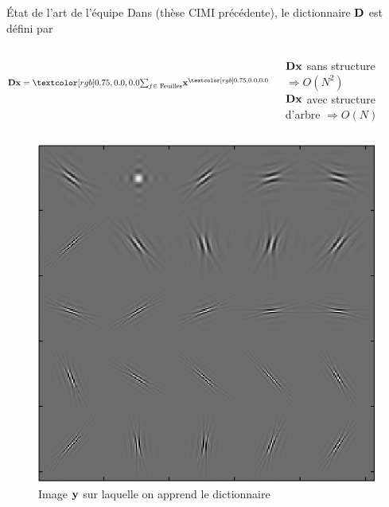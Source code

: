 \begin{frame}{État de l'art de l'équipe}
Dans  (\alert{thèse CIMI} précédente), le dictionnaire $\mathbf D$ est défini par
\begin{columns}
\begin{column}{0.60\textwidth}
\\
$\D \code = \Req{\sum_{f \in \text{ Feuilles}}} \code^{\Req{f}} * \underbrace{h^{\Req{f}}* \dots* h^{r}}_{\textrm{de la racine à la feuille}}$
\end{column}
\begin{column}{0.50\textwidth} { \small
\Req{\xmark} $\mathbf D \mathbf x$ sans structure $\Rightarrow O(N^2)$\\
\Geq{\cmark} $\mathbf D \mathbf x$ avec structure d'arbre $\Rightarrow O(N)$
}
\end{column}
\end{columns}

	\begin{columns}
	\begin{column}{0.30\textwidth}
    	\begin{figure}\centering
	\includegraphics[width=1\linewidth]{figures/curv_datafit2.png}
	\caption{Image $\mathbf y$ sur laquelle on apprend le dictionnaire}
	\end{figure}


\end{column}
\end{columns}
\end{frame}
